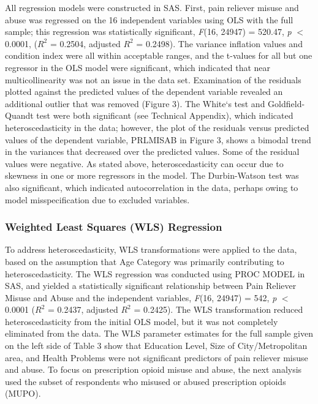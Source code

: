 \documentclass[sigconf]{acmart}
\begin{document}
All regression models were constructed in SAS. First, pain reliever misuse and 
abuse was regressed on the 16 independent variables using OLS with the full 
sample; this regression was statistically significant, \textit{F}(16, 24947) = 
520.47, \textit{p} $<$ 0.0001, ($R^2$ = 0.2504, adjusted $R^2$ = 0.2498). The 
variance inflation values and condition index were all within acceptable ranges, 
and the t-values for all but one regressor in the OLS model were significant, 
which indicated that near multicollinearity was not an issue in the data set. 
Examination of the residuals plotted against the predicted values of the 
dependent variable revealed an additional outlier that was removed (Figure 3). 
The White`s test and Goldfield-Quandt test were both significant (see Technical 
Appendix), which indicated heteroscedasticity in the data; however, the plot 
of the residuals versus predicted values of the dependent variable, PRLMISAB 
in Figure 3, shows a bimodal trend in the variances that decreased over the 
predicted values. Some of the residual values were negative. As stated above, 
heteroscedasticity can occur due to skewness in one or more regressors in the 
model. The Durbin-Watson test was also significant, which indicated 
autocorrelation in the data, perhaps owing to model misspecification due to 
excluded variables. 





\subsubsection{Weighted Least Squares (WLS) Regression} 

To address heteroscedasticity, WLS transformations were applied to the 
data, based on the assumption that Age Category was primarily contributing to 
heteroscedasticity. The WLS regression was conducted using PROC MODEL in SAS, 
and yielded a statistically significant relationship between Pain Reliever 
Misuse and Abuse and the independent variables, \textit{F}(16, 24947) = 542, 
\textit{p} $<$ 0.0001 ($R^2$ = 0.2437, adjusted $R^2$ = 0.2425). The WLS 
transformation reduced heteroscedasticity from the initial OLS model, but it 
was not completely eliminated from the data. The WLS parameter estimates for 
the full sample given on the left side of Table 3 show that Education Level, 
Size of City/Metropolitan area, and Health Problems were not significant 
predictors of pain reliever misuse and abuse. To focus on prescription opioid 
misuse and abuse, the next analysis used the subset of respondents who
misused or abused prescription opioids (MUPO). 
\end{document}
